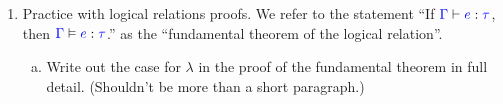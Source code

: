 \documentclass{article}
\newcommand{\meta}[1]{{\color{blue}#1}}
\newcommand{\dom}[1]{\ensuremath{\text{dom}\ #1}}
\newcommand{\progtext}[1]{\ensuremath{\text{\ttfamily\bfseries #1}}}
\newcommand{\progif}{\progtext{if}}
\newcommand{\progthen}{\progtext{then}}
\newcommand{\progelse}{\progtext{else}}
\begin{document}
\begin{enumerate}[resume*]
\begin{enumerate}[(a)]
\begin{proof}
\begin{itemize}
        According to the definition of multisubstitution, $\meta{\Gamma_2}\vdash (\meta{e_1}\ \meta{e_2})[\meta{\gamma}]:\meta{\tau_2}$.
        \item $\inferrule{
          \meta{\Gamma_1}\vdash \meta{e_1}:bool\and
          \meta{\Gamma_1}\vdash \meta{e_2}:\meta{\tau}\and
          \meta{\Gamma_1}\vdash \meta{e_3}:\meta{\tau}
        }{\meta{\Gamma_1}\vdash (\progif\ \meta{e_1}\ \progthen\ \meta{e_2}\ \progelse\ \meta{e_3}) : \meta{\tau}}$. Similar as the provious case.
        \item $\inferrule{
          \meta{x} \in \dom{\meta{\Gamma_1}}\and
          \meta{\Gamma_1}(\meta{x}) = \meta{\tau}
        }{\meta{\Gamma_1}\vdash\meta{}:\meta{\tau}}$. Since $\meta{\Gamma_1}\vdash(\meta{x}) = \meta{\tau}$. Therefore, according to our premises, $\meta{\Gamma_2}\vdash \meta{\gamma}(\meta{x}) : \meta{\tau}$.
        \item $\inferrule{
          \meta{\Gamma_1}[\meta{x}\mapsto \meta{\tau_1}]\vdash \meta{e}:\meta{\tau_2}
        }{\meta{\Gamma_1}\vdash \lambda \meta{x}.\ \meta{e} : \meta{\tau_1}\to\meta{\tau_2}}$. Since $\meta{\Gamma_2}\vdash \meta{\gamma}(\meta{x}) : \meta{\Gamma_1}(\meta{x})$ for all $\meta{x}\in \dom{\meta{\Gamma_1}}$ and $\meta{\Gamma_1}[\meta{x} \mapsto \meta{\tau_1}]\vdash \meta{e}:\meta{\tau_2}$, $\meta{\Gamma_2}[\meta{x} \mapsto \meta{\tau_1}]\vdash \meta{e}[\meta{\gamma} - \meta{x}] : \meta{\tau_2}$. Therefore, $\meta{\Gamma_2}\vdash \lambda\meta{x}.\ \meta{e}[\meta{\gamma} - \meta{x}] : \meta{\tau_1}\to \meta{\tau_2}$. According to the definition of multisubstitution, $\meta{\Gamma_2}\vdash (\lambda. \meta{x}. \meta{e})[\meta{\gamma}] : \meta{\tau_1}\to\meta{\tau_2}$.
      \end{itemize}
    \end{proof}

  \end{enumerate}

\item Practice with logical relations proofs. We refer to the statement
  ``If $\meta{\Gamma}\vdash\meta{e}:\meta{\tau}$, then $\meta{\Gamma}\vDash\meta{e}:\meta{\tau}$.''
  as the ``fundamental theorem of the logical relation''.
  \begin{enumerate}[(a)]
  \item Write out the case for $\lambda$ in the proof of the fundamental theorem
    in full detail. (Shouldn't be more than a short paragraph.)


\end{enumerate}
\end{enumerate}
\end{document}
